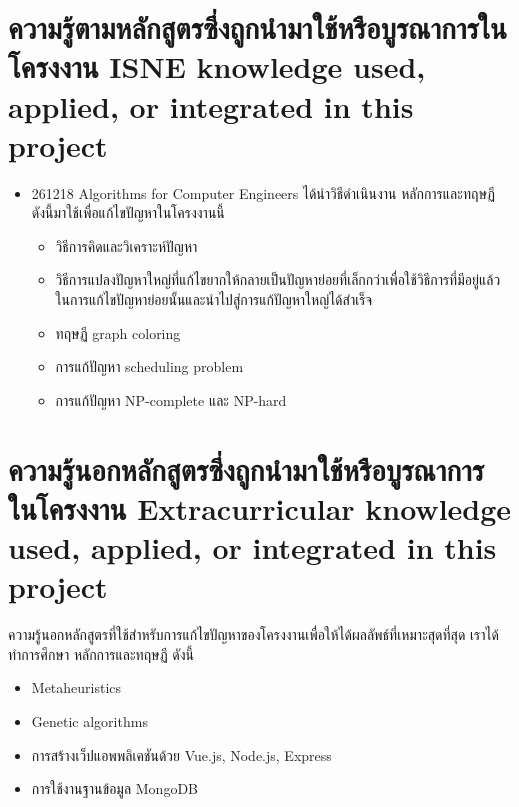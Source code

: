 \section{\ifcpe%
ความรู้ตามหลักสูตรซึ่งถูกนำมาใช้หรือบูรณาการในโครงงาน
\else%
ISNE knowledge used, applied, or integrated in this project
\fi
}
\begin{itemize}
  \item 261218 Algorithms for Computer Engineers ได้นำวิธีดำเนินงาน หลักการและทฤษฏี ดังนี้มาใช้เพื่อแก้ไขปัญหาในโครงงานนี้  
  \begin{itemize}
  \item วิธีการคิดและวิเคราะห์ปัญหา
  \item วิธีการแปลงปัญหาใหญ่ที่แก้ไขยากให้กลายเป็นปัญหาย่อยที่เล็กกว่าเพื่อใช้วิธีการที่มีอยู่แล้วในการแก้ไขปัญหาย่อยนั้นและนำไปสู่การแก้ปัญหาใหญ่ได้สำเร็จ
  \item ทฤษฏี graph coloring
  \item การแก้ปัญหา scheduling problem
  \item การแก้ปัญหา NP-complete และ NP-hard
  \end{itemize}
\end{itemize}

\section{\ifcpe%
ความรู้นอกหลักสูตรซึ่งถูกนำมาใช้หรือบูรณาการในโครงงาน
\else%
Extracurricular knowledge used, applied, or integrated in this project
\fi
}
ความรู้นอกหลักสูตรที่ใช้สำหรับการแก้ไขปัญหาของโครงงานเพื่อให้ได้ผลลัพธ์ที่เหมาะสุดที่สุด เราได้ทำการศึกษา หลักการและทฤษฏี ดังนี้
\begin{itemize}
  \item Meta­heuristics
  \item Genetic algorithms
  \item การสร้างเว็ปแอพพลิเคชันด้วย Vue.js, Node.js, Express
  \item การใช้งานฐานข้อมูล MongoDB
\end{itemize}
